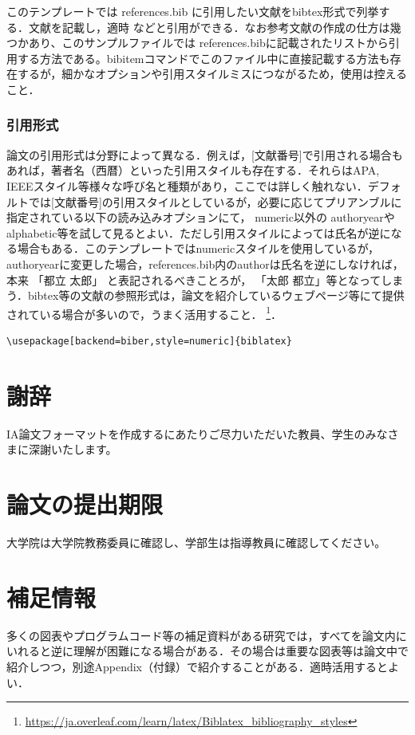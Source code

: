 \documentclass[a4paper,uplatex]{jsarticle}
\begin{document}
このテンプレートでは references.bib に引用したい文献をbibtex形式で列挙する．文献を記載し，適時 \cite{fujiwara}\cite{baba}\cite{weko_222242_1} などと引用ができる．なお参考文献の作成の仕方は幾つかあり、このサンプルファイルでは references.bibに記載されたリストから引用する方法である。bibitemコマンドでこのファイル中に直接記載する方法も存在するが，細かなオプションや引用スタイルミスにつながるため，使用は控えること．

\subsubsection{引用形式}
論文の引用形式は分野によって異なる．例えば，[文献番号]で引用される場合もあれば，著者名（西暦）といった引用スタイルも存在する．それらはAPA, IEEEスタイル等様々な呼び名と種類があり，ここでは詳しく触れない．デフォルトでは[文献番号]の引用スタイルとしているが，必要に応じてプリアンブルに指定されている以下の読み込みオプションにて， numeric以外の authoryearやalphabetic等を試して見るとよい．ただし引用スタイルによっては氏名が逆になる場合もある．このテンプレートではnumericスタイルを使用しているが，authoryearに変更した場合，references.bib内のauthorは氏名を逆にしなければ，本来 「都立 太郎」 と表記されるべきことろが， 「太郎 都立」等となってしまう．bibtex等の文献の参照形式は，論文を紹介しているウェブページ等にて提供されている場合が多いので，うまく活用すること．
 \footnote{\url{https://ja.overleaf.com/learn/latex/Biblatex_bibliography_styles}}．
\begin{verbatim}
\usepackage[backend=biber,style=numeric]{biblatex}    
\end{verbatim}



\renewcommand\refname{参考文献}
\printbibliography


\section*{謝辞}
IA論文フォーマットを作成するにあたりご尽力いただいた教員、学生のみなさまに深謝いたします。


\section*{論文の提出期限}
大学院は大学院教務委員に確認し、学部生は指導教員に確認してください。

\appendix
\section{補足情報}
多くの図表やプログラムコード等の補足資料がある研究では，すべてを論文内にいれると逆に理解が困難になる場合がある．その場合は重要な図表等は論文中で紹介しつつ，別途Appendix（付録）で紹介することがある．適時活用するとよい．
\end{document}
